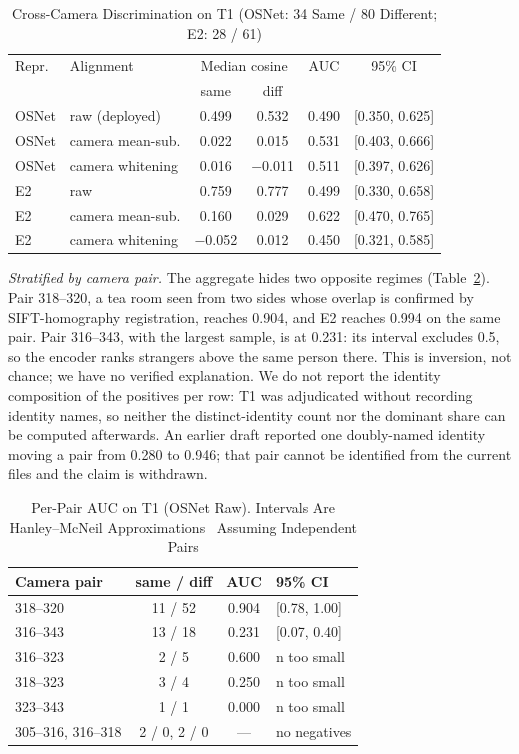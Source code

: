 \documentclass[journal]{IEEEtran}
\begin{document}
\begin{table}[t]
\caption{Cross-Camera Discrimination on T1 (OSNet: 34 Same / 80 Different; E2: 28 / 61)}\label{tab:agg}
\centering
\setlength{\tabcolsep}{4pt}
\begin{tabular}{@{}llcccc@{}}
\toprule
Repr. & Alignment & \multicolumn{2}{c}{Median cosine} & AUC & 95\% CI\\
 & & same & diff & & \\
\midrule
OSNet & raw (deployed) & 0.499 & 0.532 & 0.490 & [0.350, 0.625]\\
OSNet & camera mean-sub. & 0.022 & 0.015 & 0.531 & [0.403, 0.666]\\
OSNet & camera whitening & 0.016 & $-$0.011 & 0.511 & [0.397, 0.626]\\
E2 & raw & 0.759 & 0.777 & 0.499 & [0.330, 0.658]\\
E2 & camera mean-sub. & 0.160 & 0.029 & 0.622 & [0.470, 0.765]\\
E2 & camera whitening & $-$0.052 & 0.012 & 0.450 & [0.321, 0.585]\\
\bottomrule
\end{tabular}
\end{table}

\emph{Stratified by camera pair.} The aggregate hides two opposite regimes (Table~\ref{tab:pair}). Pair 318--320, a tea room seen from two sides whose overlap is confirmed by SIFT-homography registration, reaches 0.904, and E2 reaches 0.994 on the same pair. Pair 316--343, with the largest sample, is at 0.231: its interval excludes 0.5, so the encoder ranks strangers above the same person there. This is inversion, not chance; we have no verified explanation. We do not report the identity composition of the positives per row: T1 was adjudicated without recording identity names, so neither the distinct-identity count nor the dominant share can be computed afterwards. An earlier draft reported one doubly-named identity moving a pair from 0.280 to 0.946; that pair cannot be identified from the current files and the claim is withdrawn.

\begin{table}[t]
\caption{Per-Pair AUC on T1 (OSNet Raw). Intervals Are Hanley--McNeil Approximations~\cite{hanley1982} Assuming Independent Pairs}\label{tab:pair}
\centering
\setlength{\tabcolsep}{4pt}
\begin{tabular}{@{}lccl@{}}
\toprule
Camera pair & same / diff & AUC & 95\% CI\\
\midrule
318--320 & 11 / 52 & 0.904 & [0.78, 1.00]\\
316--343 & 13 / 18 & 0.231 & [0.07, 0.40]\\
316--323 & 2 / 5 & 0.600 & n too small\\
318--323 & 3 / 4 & 0.250 & n too small\\
323--343 & 1 / 1 & 0.000 & n too small\\
305--316, 316--318 & 2 / 0, 2 / 0 & --- & no negatives\\
\bottomrule
\end{tabular}
\end{table}
\end{document}

